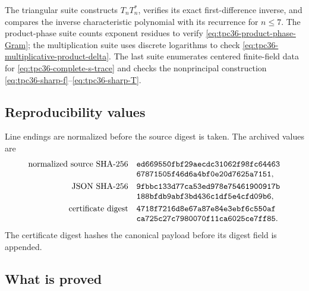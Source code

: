 The triangular suite constructs \(T_nT_n^*\), verifies its exact
first-difference inverse, and compares the inverse characteristic
polynomial with its recurrence for \(n\le7\).  The
product-phase suite counts exponent residues to verify
\eqref{eq:tpc36-product-phase-Gram}; the multiplication suite uses discrete
logarithms to check \eqref{eq:tpc36-multiplicative-product-delta}.  The
last suite enumerates centered finite-field data for
\eqref{eq:tpc36-complete-s-trace} and checks the nonprincipal construction
\eqref{eq:tpc36-sharp-f}--\eqref{eq:tpc36-sharp-T}.

\subsection{Reproducibility values}

Line endings are normalized before the source digest is taken.  The
archived values are
\begin{align}
 \text{normalized source SHA-256}\quad
 &\texttt{ed669550fbf29aecdc31062f98fc64463}
 \notag\\[-0.3em]
 &\texttt{67871505f46d6a4bf0e20d7625a7151},
 \label{eq:tpc36-source-hash}\\
 \text{JSON SHA-256}\quad
 &\texttt{9fbbc133d77ca53ed978e75461900917b}
 \notag\\[-0.3em]
 &\texttt{188bfdb9abf3bd436c1df5e4cfd09b6},
 \label{eq:tpc36-json-hash}\\
 \text{certificate digest}\quad
 &\texttt{4718f7216d8e67a87e84e3ebf6c550af}
 \notag\\[-0.3em]
 &\texttt{ca725c27c7980070f11ca6025ce7ff85}.
 \label{eq:tpc36-certificate-digest}
\end{align}
The certificate digest hashes the canonical payload before its digest
field is appended.

\subsection{What is proved}

